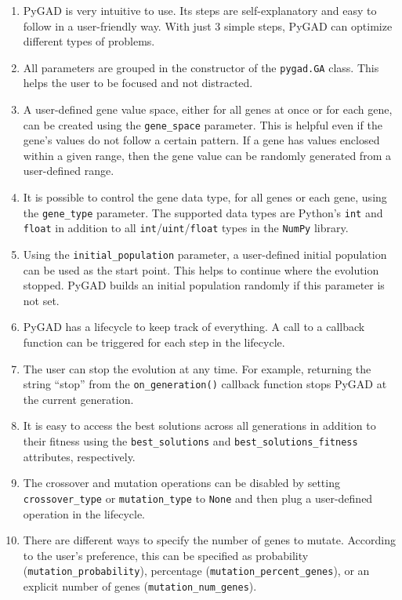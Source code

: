 \documentclass[conference]{IEEEtran}
\begin{document}
\begin{enumerate}
  \item PyGAD is very intuitive to use. Its steps are self-explanatory and easy to follow in a user-friendly way. With just 3 simple steps, PyGAD can optimize different types of problems.
  \item All parameters are grouped in the constructor of the \texttt{pygad.GA} class. This helps the user to be focused and not distracted. 
  \item A user-defined gene value space, either for all genes at once or for each gene, can be created using the \texttt{gene\_space} parameter. This is helpful even if the gene's values do not follow a certain pattern. If a gene has values enclosed within a given range, then the gene value can be randomly generated from a user-defined range.
  \item It is possible to control the gene data type, for all genes or each gene, using the \texttt{gene\_type} parameter. The supported data types are Python's \texttt{int} and \texttt{float} in addition to all \texttt{int}/\texttt{uint}/\texttt{float} types in the \texttt{NumPy} library.
  \item Using the \texttt{initial\_population} parameter, a user-defined initial population can be used as the start point. This helps to continue where the evolution stopped. PyGAD builds an initial population randomly if this parameter is not set.
  \item PyGAD has a lifecycle to keep track of everything. A call to a callback function can be triggered for each step in the lifecycle.
  \item The user can stop the evolution at any time. For example, returning the string ``stop'' from the \texttt{on\_generation()} callback function stops PyGAD at the current generation.
  \item It is easy to access the best solutions across all generations in addition to their fitness using the \texttt{best\_solutions} and \texttt{best\_solutions\_fitness} attributes, respectively.
  \item The crossover and mutation operations can be disabled by setting \texttt{crossover\_type} or \texttt{mutation\_type} to \texttt{None} and then plug a user-defined operation in the lifecycle.
  \item There are different ways to specify the number of genes to mutate. According to the user's preference, this can be specified as probability (\texttt{mutation\_probability}), percentage (\texttt{mutation\_percent\_genes}), or an explicit number of genes (\texttt{mutation\_num\_genes}).

\end{enumerate}
\end{document}
